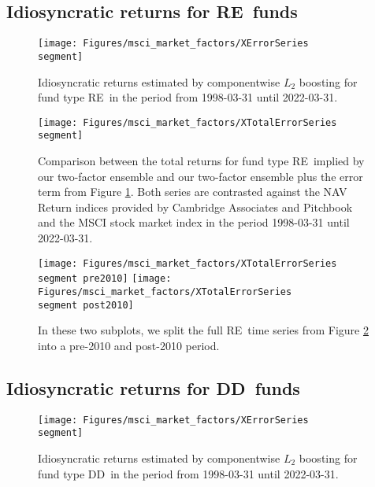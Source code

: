 \renewcommand{\segment}{RE}

\subsection{Idiosyncratic returns for \segment \ funds}
\label{sec:errors_\segment}

\begin{figure}[H]
	\centering
	\texttt{[image: Figures/msci\_market\_factors/XErrorSeries\\segment]}
	\caption{Idiosyncratic returns estimated by componentwise $L_2$ boosting for fund type \segment \ in the period from 1998-03-31 until 2022-03-31.}
	\label{fig:clb_idio_\segment}
\end{figure}

\begin{figure}[H]
	\centering
	\texttt{[image: Figures/msci\_market\_factors/XTotalErrorSeries\\segment]}
	\caption{
		Comparison between the total returns for fund type \segment \ implied by our two-factor ensemble and our two-factor ensemble plus the error term from Figure \ref{fig:clb_idio_\segment}.
		Both series are contrasted against the NAV Return indices provided by Cambridge Associates and Pitchbook and the MSCI stock market index in the period 1998-03-31 until 2022-03-31.
	}
	\label{fig:clb_total_\segment}
\end{figure}

\begin{figure}[H]
	\centering
	\texttt{[image: Figures/msci\_market\_factors/XTotalErrorSeries\\segment pre2010]}
	\texttt{[image: Figures/msci\_market\_factors/XTotalErrorSeries\\segment post2010]}
	\caption{
		In these two subplots, we split the full \segment \ time series from Figure \ref{fig:clb_total_\segment} into a pre-2010 and post-2010 period.
	}
	\label{fig:clb_pre_post_2010_\segment}
\end{figure}


\renewcommand{\segment}{DD}

\subsection{Idiosyncratic returns for \segment \ funds}
\label{sec:errors_\segment}

\begin{figure}[H]
	\centering
	\texttt{[image: Figures/msci\_market\_factors/XErrorSeries\\segment]}
	\caption{Idiosyncratic returns estimated by componentwise $L_2$ boosting for fund type \segment \ in the period from 1998-03-31 until 2022-03-31.}
	\label{fig:clb_idio_\segment}
\end{figure}

